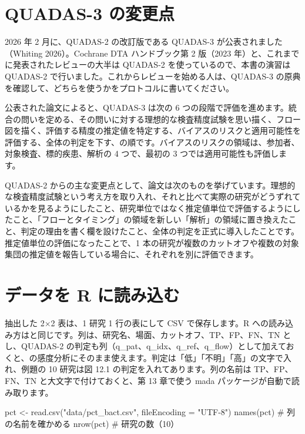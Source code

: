 \section{\hatten QUADAS-3 の変更点}
\label{sec:12-9}

2026 年 2 月に、QUADAS-2 の改訂版である QUADAS-3 が公表されました（Whiting 2026）。Cochrane DTA ハンドブック第 2 版（2023 年）と、これまでに発表されたレビューの大半は QUADAS-2 を使っているので、本書の演習は QUADAS-2 で行いました。これからレビューを始める人は、QUADAS-3 の原典を確認して、どちらを使うかをプロトコルに書いてください。

公表された論文によると、QUADAS-3 は次の 6 つの段階で評価を進めます。統合の問いを定める、その問いに対する理想的な検査精度試験を思い描く、フロー図を描く、評価する精度の推定値を特定する、バイアスのリスクと適用可能性を評価する、全体の判定を下す、の順です。バイアスのリスクの領域は、参加者、対象検査、標的疾患、解析の 4 つで、最初の 3 つでは適用可能性も評価します。

QUADAS-2 からの主な変更点として、論文は次のものを挙げています。理想的な検査精度試験という考え方を取り入れ、それと比べて実際の研究がどうずれているかを見るようにしたこと、研究単位ではなく推定値単位で評価するようにしたこと、「フローとタイミング」の領域を新しい「解析」の領域に置き換えたこと、判定の理由を書く欄を設けたこと、全体の判定を正式に導入したことです。推定値単位の評価になったことで、1 本の研究が複数のカットオフや複数の対象集団の推定値を報告している場合に、それぞれを別に評価できます。

\section{データを R に読み込む}
\label{sec:12-10}

抽出した 2×2 表は、1 研究 1 行の表にして CSV で保存します。R への読み込み方はと同じです。列は、研究名、場面、カットオフ、TP、FP、FN、TN とし、QUADAS-2 の判定も列（q\_pat、q\_idx、q\_ref、q\_flow）として加えておくと、の感度分析にそのまま使えます。判定は「低」「不明」「高」の文字で入れ、例題の 10 研究は図 12.1 の判定を入れてあります。列の名前は TP、FP、FN、TN と大文字で付けておくと、第 13 章で使う mada パッケージが自動で読み取ります。

\begin{rcode}
pct <- read.csv("data/pct_bact.csv",
                fileEncoding = "UTF-8")
names(pct)        # 列の名前を確かめる
nrow(pct)         # 研究の数（10）
\end{rcode}

